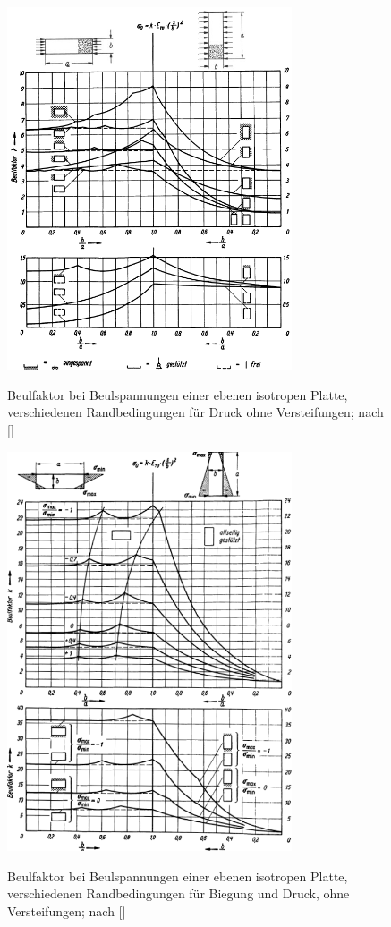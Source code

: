 \begin{figure}[h]
	\centering
	\includegraphics[width=0.75\textwidth]{Bilder/Hertel Druck.png}
	\label{fig: Hertel_Druck}
	\caption{Beulfaktor bei Beulspannungen einer ebenen isotropen Platte, verschiedenen Randbedingungen für Druck ohne Versteifungen; nach []}
\end{figure}
\begin{figure}[h]
	\centering
	\includegraphics[width=0.75\textwidth]{Bilder/Hertel Biegung.png}
	\label{fig: Hertel_Biegung}
	\caption{Beulfaktor bei Beulspannungen einer ebenen isotropen Platte, verschiedenen Randbedingungen für Biegung und Druck, ohne Versteifungen; nach []}
\end{figure}
